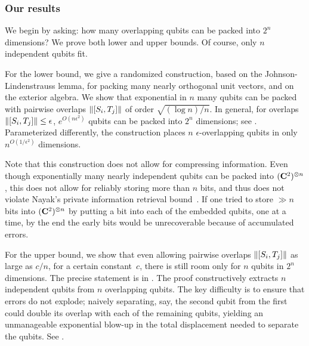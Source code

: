 \documentclass[11pt]{article}
\begin{document}
\subsubsection*{Our results}

We begin by asking: how many overlapping qubits can be packed into $2^n$ dimensions?  We prove both lower and upper bounds.  Of course, only $n$ independent qubits fit.  

For the lower bound, we give a randomized construction, based on the Johnson-Lindenstrauss lemma, for packing many nearly orthogonal unit vectors, and on the exterior algebra.  We show that exponential in $n$ many qubits can be packed with pairwise overlaps ${\| [S_i, T_j] \|}$ of order $\sqrt{(\log n) / n}$.  In general, for overlaps ${\| [S_i, T_j] \|} \leq \epsilon$, $e^{O(n \epsilon^2)}$ qubits can be packed into $2^n$ dimensions; see .  Parameterized differently, the construction places $n$ $\epsilon$-overlapping qubits in only $n^{O(1/\epsilon^2)}$ dimensions.  

Note that this construction does not allow for compressing information.  Even though exponentially many nearly independent qubits can be packed into $({\bf C}^2)^{\otimes n}$, this does not allow for reliably storing more than $n$ bits, and thus does not violate Nayak's private information retrieval bound~\cite{Nayak99privateinformationretrieval}.  If one tried to store $\gg n$ bits into $({\bf C}^2)^{\otimes n}$ by putting a bit into each of the embedded qubits, one at a time, by the end the early bits would be unrecoverable because of accumulated errors.  

For the upper bound, we show that even allowing pairwise overlaps ${\| [S_i, T_j] \|}$ as large as $c / n$, for a certain constant~$c$, there is still room only for $n$ qubits in $2^n$ dimensions.  The precise statement is in .  The proof constructively extracts $n$ independent qubits from $n$ overlapping qubits.  The key difficulty is to ensure that errors do not explode; naively separating, say, the second qubit from the first could double its overlap with each of the remaining qubits, yielding an unmanageable exponential blow-up in the total displacement needed to separate the qubits.  See .  
\end{document}
